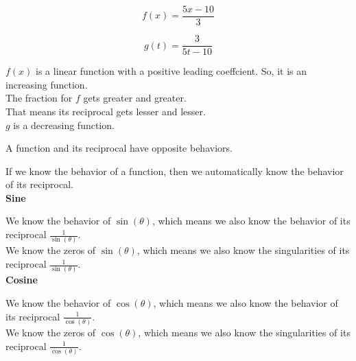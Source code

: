 \documentclass{ximera}
\begin{document}
\begin{exmaple}
\[
f(x) = \frac{5x - 10}{3}
\]




\[
g(t) = \frac{3}{5t - 10}
\]



$f(x)$ is a linear function with a positive leading coeffcient.  So, it is an increasing function. \\


The fraction for $f$ gets greater and greater. \\

That means its reciprocal gets lesser and lesser. \\

$g$ is a decreasing function.




\begin{fact}

A function and its reciprocal have opposite behaviors.


\end{fact}

If we know the behavior of a function, then we automatically know the behavior of its reciprocal. \\





\textbf{\textcolor{purple!80!black}{Sine}} 

We know the behavior of $\sin(\theta)$, which means we also know the behavior of its reciprocal $\frac{1}{\sin(\theta)}$. \\


We know the zeros of $\sin(\theta)$, which means we also know the singularities of its reciprocal $\frac{1}{\sin(\theta)}$. \\







\textbf{\textcolor{purple!80!black}{Cosine}} 

We know the behavior of $\cos(\theta)$, which means we also know the behavior of its reciprocal $\frac{1}{\cos(\theta)}$. \\


We know the zeros of $\cos(\theta)$, which means we also know the singularities of its reciprocal $\frac{1}{\cos(\theta)}$. \\











\end{exmaple}
\end{document}
